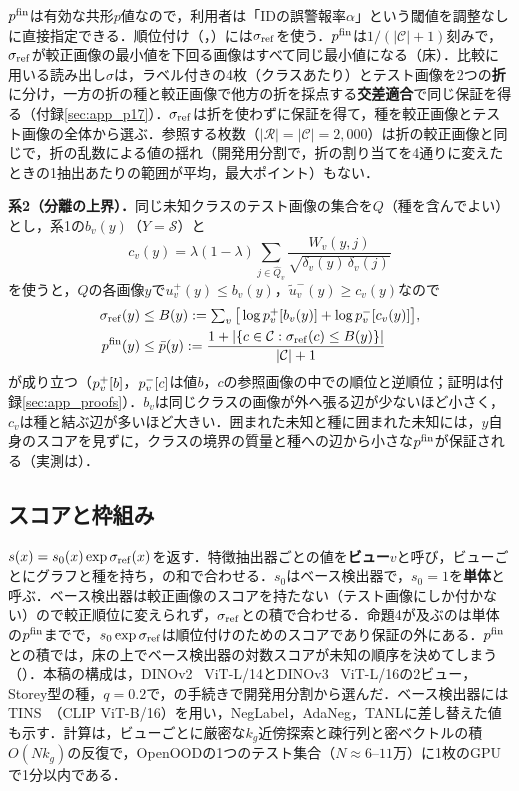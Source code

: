 $p^{\mathrm{fin}}$は有効な共形$p$値なので，利用者は「IDの誤警報率$\alpha$」という閾値を調整なしに直接指定できる．順位付け（\AUC{}，\FPR{}）には$\sigma_{\mathrm{ref}}$を使う．$p^{\mathrm{fin}}$は$1/(|\mathcal{C}|+1)$刻みで，$\sigma_{\mathrm{ref}}$が較正画像の最小値を下回る画像はすべて同じ最小値になる（床）．比較に用いる読み出し$\sigma$は，ラベル付きの4枚（クラスあたり）とテスト画像を2つの\textbf{折}に分け，一方の折の種と較正画像で他方の折を採点する\textbf{交差適合}で同じ保証を得る（付録\ref{sec:app_p17}）．$\sigma_{\mathrm{ref}}$は折を使わずに保証を得て，種を較正画像とテスト画像の全体から選ぶ．参照する枚数（$|\mathcal{R}|=|\mathcal{C}|=2{,}000$）は折の較正画像と同じで，折の乱数による値の揺れ（開発用分割で，折の割り当てを4通りに変えたときの1抽出あたりの範囲が平均\NRFcRangeFourMean{}，最大\NRFcRangeFourMax{}ポイント）もない．

\textbf{系2（分離の上界）．}同じ未知クラスのテスト画像の集合を$Q$（種を含んでよい）とし，系1の$b_v(y)$（$Y=\mathcal{S}$）と
\begin{equation}
c_v(y)=\lambda(1-\lambda)\sum_{j\in\hat{Q}_v}\frac{W_v(y,j)}{\sqrt{\delta_v(y)\,\delta_v(j)}}
\label{eq:cy}
\end{equation}
を使うと，$Q$の各画像$y$で$u^{+}_v(y)\le b_v(y)$，$\tilde{u}^{-}_v(y)\ge c_v(y)$なので
\begin{equation}
\begin{aligned}
\sigma_{\mathrm{ref}}(y)&\le B(y):=\textstyle\sum_v\big[\log p^{+}_v[b_v(y)]+\log p^{-}_v[c_v(y)]\big],\\
p^{\mathrm{fin}}(y)&\le\bar p(y):=\frac{1+|\{c\in\mathcal{C}:\sigma_{\mathrm{ref}}(c)\le B(y)\}|}{|\mathcal{C}|+1}
\end{aligned}
\label{eq:cor2}
\end{equation}
が成り立つ（$p^{+}_v[b]$，$p^{-}_v[c]$は値$b$，$c$の参照画像の中での順位と逆順位；証明は付録\ref{sec:app_proofs}）．$b_v$は同じクラスの画像が外へ張る辺が少ないほど小さく，$c_v$は種と結ぶ辺が多いほど大きい．囲まれた未知と種に囲まれた未知には，$y$自身のスコアを見ずに，クラスの境界の質量と種への辺から小さな$p^{\mathrm{fin}}$が保証される（実測は）．

\subsection{スコアと枠組み}
\label{sec:score}
$s(x)=s_0(x)\exp\sigma_{\mathrm{ref}}(x)$を返す．特徴抽出器ごとの値を\textbf{ビュー}$v$と呼び，ビューごとにグラフと種を持ち，の和で合わせる．$s_0$はベース検出器で，$s_0{=}1$を\textbf{単体}と呼ぶ．ベース検出器は較正画像のスコアを持たない（テスト画像にしか付かない）ので較正順位に変えられず，$\sigma_{\mathrm{ref}}$との積で合わせる．命題4が及ぶのは単体の$p^{\mathrm{fin}}$までで，$s_0\exp\sigma_{\mathrm{ref}}$は順位付けのためのスコアであり保証の外にある．$p^{\mathrm{fin}}$との積では，床の上でベース検出器の対数スコアが未知の順序を決めてしまう（）．本稿の構成は，DINOv2~\cite{oquab2024dinov2} ViT-L/14とDINOv3~\cite{simeoni2025dinov3} ViT-L/16の2ビュー，Storey型の種，$q{=}0.2$で，の手続きで開発用分割から選んだ．ベース検出器にはTINS~\cite{yang2026tins}（CLIP ViT-B/16）を用い，NegLabel，AdaNeg，TANLに差し替えた値も示す．計算は，ビューごとに厳密な$k_g$近傍探索と疎行列と密ベクトルの積$O(Nk_g)$の反復で，OpenOODの1つのテスト集合（$N\approx6$--$11$万）に1枚のGPUで1分以内である．

